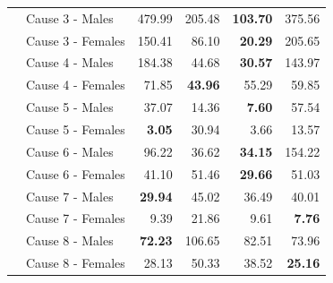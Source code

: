 \begin{center}
\begin{small}
\begin{longtable}{@{}llrrrr@{}}
& Cause 3 - Males & 479.99 & 205.48 & \textbf{103.70} & 375.56 \\
& Cause 3 - Females & 150.41 & 86.10 & \textbf{20.29} & 205.65 \\
& Cause 4 - Males & 184.38 & 44.68 & \textbf{30.57} & 143.97 \\
& Cause 4 - Females & 71.85 & \textbf{43.96} & 55.29 & 59.85 \\
& Cause 5 - Males & 37.07 & 14.36 & \textbf{7.60} & 57.54 \\
& Cause 5 - Females & \textbf{3.05} & 30.94 & 3.66 & 13.57 \\
& Cause 6 - Males & 96.22 & 36.62 & \textbf{34.15} & 154.22 \\
& Cause 6 - Females & 41.10 & 51.46 & \textbf{29.66} & 51.03 \\
& Cause 7 - Males & \textbf{29.94} & 45.02 & 36.49 & 40.01 \\
& Cause 7 - Females & 9.39 & 21.86 & 9.61 & \textbf{7.76} \\
& Cause 8 - Males & \textbf{72.23} & 106.65 & 82.51 & 73.96 \\
& Cause 8 - Females & 28.13 & 50.33 & 38.52 & \textbf{25.16} \\
\bottomrule
\end{longtable}
\end{small}
\end{center}
